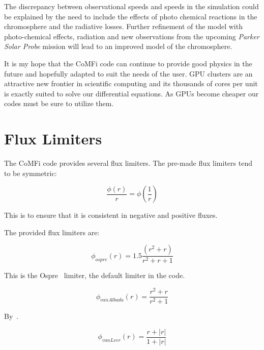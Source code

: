 \documentclass[12pt,upcase]{umlthesis}
\begin{document}
The discrepancy between observational speeds and speeds in the simulation could be explained by the need to include the effects of photo chemical reactions in the chromosphere and the radiative losses. Further refinement of the model with photo-chemical effects, radiation and new observations from the upcoming {\it Parker Solar Probe\/} mission will lead to an improved model of the chromosphere.  

It is my hope that the CoMFi code can continue to provide good physics in the future and hopefully adapted to suit the needs of the user. GPU clusters are an attractive new frontier in scientific computing and its thousands of cores per unit is exactly suited to solve our differential equations. As GPUs become cheaper our codes must be sure to utilize them.

\nocite{*}



\appendix
\chapter{Flux Limiters}\label{app:fluxlimiters}

The CoMFi code provides several flux limiters. The pre-made flux limiters tend to be symmetric:

\begin{equation}
	\frac{\phi(r)}{r} = \phi(\frac{1}{r})
\end{equation}

This is to ensure that it is consistent in negative and positive fluxes.

The provided flux limiters are:

\begin{equation}
	\phi_{ospre} (r) = 1.5 \frac{(r^2 + r)}{r^2 + r + 1}
\end{equation}

This is the Ospre~\citep{Waterson2007} limiter, the default limiter in the code.

\begin{equation}
	\phi_{van Albada} (r) = \frac{r^2 + r}{r^2 + 1}
\end{equation}

By~\citet{vanalbada1982}.

\begin{equation}
	\phi_{van Leer} (r) = \frac{r + \lvert r \rvert}{1 + \lvert r \rvert}
\end{equation}
\end{document}
